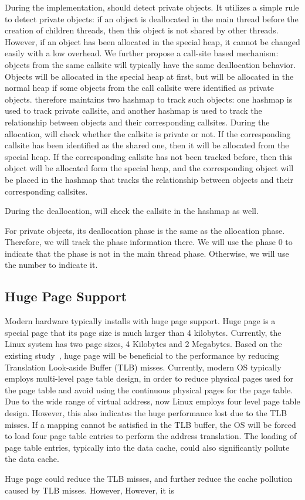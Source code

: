 During the implementation, \NM{} should detect private objects. It utilizes a simple rule to detect private objects: if an object is deallocated in the main thread before the creation of children threads, then this object is not shared by other threads. However, if an object has been allocated in the special heap, it cannot be changed easily with a low overhead. We further propose a call-site based mechanism: objects from the same callsite will typically have the same deallocation behavior. Objects will be allocated in the special heap at first, but will be allocated in the normal heap if some objects from the call callsite were identified as private objects. \NM{} therefore maintains two hashmap to track such objects: one hashmap is used to track private callsite, and another hashmap is used to track the relationship between objects and their corresponding callsites. 
During the allocation, \NM{} will check whether the callsite is private or not. If the corresponding callsite has been identified as the shared one, then it will be allocated from the special heap. If the corresponding callsite has not been tracked before, then this object will be allocated form the special heap, and the corresponding object will be placed in the hashmap that tracks the relationship between objects and their corresponding callsites. 

During the deallocation, \NM{} will check the callsite in the hashmap as well. 

For private objects, its deallocation phase is the same as the allocation phase. Therefore, we will track the phase information there. 
We will use the phase 0 to indicate that the phase is not in the main thread phase. Otherwise, we will use the number to indicate it.   

\subsection{Huge Page Support}

Modern hardware typically installs with huge page support. Huge page is a special page that its page size is much larger than 4 kilobytes. Currently, the Linux system has two page sizes, 4 Kilobytes and 2 Megabytes.  
Based on the existing study~\cite{hugepages}, huge page will be beneficial to the performance by reducing Translation Look-aside Buffer (TLB) misses.  Currently, modern OS typically employs multi-level page table design, in order to reduce physical pages used for the page table and avoid using the continuous physical pages for the page table. Due to the wide range of virtual address, now Linux employs four level page table design. However, this also indicates the huge performance lost due to the TLB misses. If a mapping cannot be satisfied in the TLB buffer, the OS will be forced to load four page table entries to perform the address translation. The loading of page table entries, typically into the data cache, could also significantly pollute the data cache. 
 
Huge page could reduce the TLB misses, and further reduce the cache pollution caused by TLB misses. However, 
However, it is 



